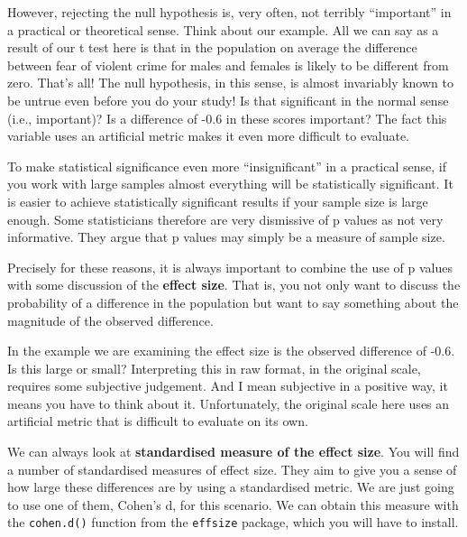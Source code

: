\documentclass[
]{book}
\newenvironment{Shaded}{\begin{snugshade}}{\end{snugshade}}
\newcommand{\AttributeTok}[1]{\textcolor[rgb]{0.77,0.63,0.00}{#1}}
\newcommand{\ConstantTok}[1]{\textcolor[rgb]{0.00,0.00,0.00}{#1}}
\newcommand{\FunctionTok}[1]{\textcolor[rgb]{0.00,0.00,0.00}{#1}}
\newcommand{\NormalTok}[1]{#1}
\newcommand{\SpecialCharTok}[1]{\textcolor[rgb]{0.00,0.00,0.00}{#1}}
\begin{document}
However, rejecting the null hypothesis is, very often, not terribly ``important'' in a practical or theoretical sense. Think about our example. All we can say as a result of our t test here is that in the population on average the difference between fear of violent crime for males and females is likely to be different from zero. That's all! The null hypothesis, in this sense, is almost invariably known to be untrue even before you do your study! Is that significant in the normal sense (i.e., important)? Is a difference of -0.6 in these scores important? The fact this variable uses an artificial metric makes it even more difficult to evaluate.

To make statistical significance even more ``insignificant'' in a practical sense, if you work with large samples almost everything will be statistically significant. It is easier to achieve statistically significant results if your sample size is large enough. Some statisticians therefore are very dismissive of p values as not very informative. They argue that p values may simply be a measure of sample size.

Precisely for these reasons, it is always important to combine the use of p values with some discussion of the \textbf{effect size}. That is, you not only want to discuss the probability of a difference in the population but want to say something about the magnitude of the observed difference.

In the example we are examining the effect size is the observed difference of -0.6. Is this large or small? Interpreting this in raw format, in the original scale, requires some subjective judgement. And I mean subjective in a positive way, it means you have to think about it. Unfortunately, the original scale here uses an artificial metric that is difficult to evaluate on its own.

We can always look at \textbf{standardised measure of the effect size}. You will find a number of standardised measures of effect size. They aim to give you a sense of how large these differences are by using a standardised metric. We are just going to use one of them, Cohen's d, for this scenario. We can obtain this measure with the \texttt{cohen.d()} function from the \texttt{effsize} package, which you will have to install.

\begin{Shaded}
\end{Shaded}
\end{document}
